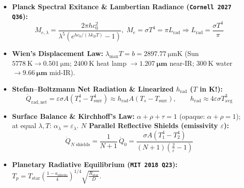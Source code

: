 \documentclass[10pt,twoside,openany,letterpaper]{book}
\begin{document}
\begin{quicksheet}
\begin{twocol}[0.49]
\begin{formulacard}
\begin{itemize}
\end{itemize}
\end{formulacard}
\nextcol[0.49]
\begin{formulacard}
\scriptsize
\begin{itemize}
  \item \textbf{Planck Spectral Exitance \& Lambertian Radiance (\texttt{Cornell 2027 Q36}):}
  \[
    M_{e,\lambda} = \frac{2\pi h c_0^2}{\lambda^5(e^{hc_0/(\lambda k_B T)} - 1)},\; M_e = \sigma T^4 = \pi L_{\mathrm{rad}} \Rightarrow \boxed{L_{\mathrm{rad}} = \frac{\sigma T^4}{\pi}}
  \]
  \item \textbf{Wien's Displacement Law:} $\boxed{\lambda_{\max} T = b = \SI{2897.77}{\micro\meter\kelvin}}$ (Sun $\SI{5778}{\kelvin} \to \SI{0.501}{\micro\meter}$; $\SI{2400}{\kelvin}$ heat lamp $\to \mathbf{\SI{1.207}{\micro\meter}}$ near-IR; $\SI{300}{\kelvin}$ water $\to \mathbf{\SI{9.66}{\micro\meter}}$ mid-IR).
  \item \textbf{Stefan--Boltzmann Net Radiation \& Linearized $h_{\mathrm{rad}}$ ($T$ in $\mathbf{\si{\kelvin}}$!):}
  \[
    \boxed{\dot{Q}_{\mathrm{rad,net}} = \varepsilon\sigma A\left(T_s^4 - T_{\mathrm{surr}}^4\right) \approx h_{\mathrm{rad}}A(T_s - T_{\mathrm{surr}})}, \qquad h_{\mathrm{rad}} \approx 4\varepsilon\sigma T_{\mathrm{avg}}^3
  \]
  \item \textbf{Surface Balance \& Kirchhoff's Law:} $\alpha + \rho + \tau = 1$ (opaque: $\alpha + \rho = 1$); at equal $\lambda, T$: $\alpha_\lambda = \varepsilon_\lambda$. \textbf{$N$ Parallel Reflective Shields (emissivity $\varepsilon$):}
  \[
    \boxed{\dot{Q}_{N\text{ shields}} = \frac{1}{N + 1}\,\dot{Q}_{0} = \frac{\sigma A(T_1^4 - T_2^4)}{(N + 1)\left(\frac{2}{\varepsilon} - 1\right)}}
  \]
  \item \textbf{Planetary Radiative Equilibrium (\texttt{MIT 2018 Q23}):} $T_p = T_{\mathrm{star}}\left(\frac{1 - a_{\mathrm{albedo}}}{4}\right)^{1/4}\sqrt{\frac{R_{\mathrm{star}}}{D}}$.
\end{itemize}
\end{formulacard}
\end{twocol}
\end{quicksheet}
\end{document}
